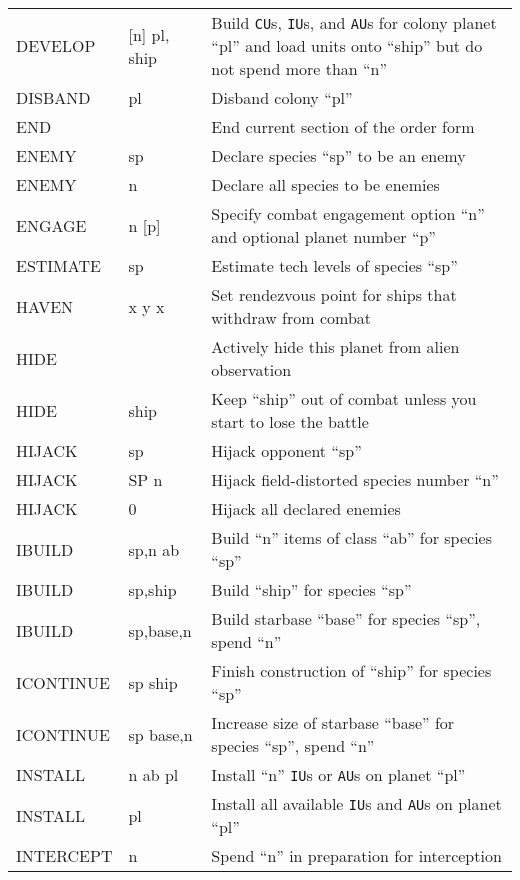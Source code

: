 \documentclass[10pt,titlepage]{article}
\begin{document}
\begin{longtable}{|llp{9cm}|}
DEVELOP    &     [n] pl, ship &    Build \texttt{CU}s, \texttt{IU}s, and \texttt{AU}s for colony planet ``pl''  and load units onto ``ship'' but do not spend more than ``n'' \\
DISBAND   &      pl      &        Disband colony ``pl'' \\
END       &              &        End current section of the order form \\
ENEMY     &      sp      &        Declare species ``sp'' to be an enemy \\
ENEMY     &      n       &        Declare all species to be enemies \\
ENGAGE    &      n [p]      &     Specify combat engagement option ``n'' and optional planet number ``p'' \\
ESTIMATE  &      sp         &     Estimate tech levels of species ``sp''  \\
HAVEN    &       x y x      &     Set rendezvous point for ships that withdraw from combat \\
HIDE   &                    &     Actively hide this planet from alien observation \\
HIDE   &         ship       &     Keep ``ship'' out of combat unless you start to lose the battle \\
HIJACK  &        sp         &     Hijack opponent ``sp'' \\
HIJACK  &        SP n       &     Hijack field-distorted species number ``n'' \\
HIJACK  &        0          &     Hijack all declared enemies \\
IBUILD  &        sp,n ab    &     Build ``n'' items of class ``ab'' for species ``sp'' \\
IBUILD  &        sp,ship    &     Build ``ship'' for species ``sp'' \\
IBUILD  &        sp,base,n   &    Build starbase ``base'' for species ``sp'', spend ``n'' \\
ICONTINUE &      sp ship     &    Finish construction of ``ship'' for species ``sp'' \\
ICONTINUE &      sp base,n   &    Increase size of starbase ``base'' for species ``sp'', spend ``n'' \\
INSTALL   &      n ab pl      &   Install ``n'' \texttt{IU}s or \texttt{AU}s on planet ``pl'' \\
INSTALL   &      pl           &   Install all available \texttt{IU}s and \texttt{AU}s on planet ``pl'' \\
INTERCEPT &      n            &   Spend ``n'' in preparation for interception \\

\end{longtable}
\end{document}
